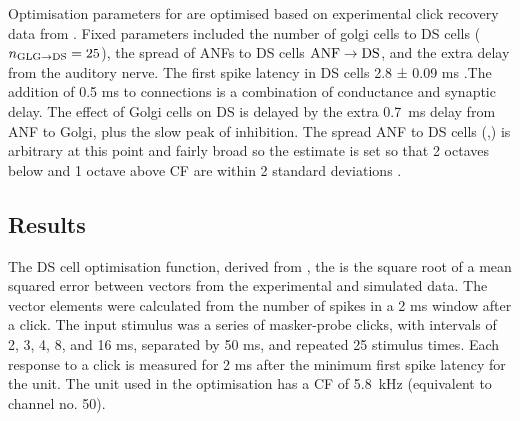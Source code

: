 Optimisation parameters for \GLGDS are optimised based on experimental click
recovery data from \citep{BackoffPalombiEtAl:1997}.  Fixed parameters included
the number of golgi cells to DS cells ($\protect n_{\protect\textrm{{GLG}}\to\textrm{{DS}}} = 25$), the spread of ANFs to DS
cells $\protect\textrm{{ANF}}\to\textrm{{DS}}$, and the extra delay from the auditory nerve.  The first spike
latency in DS cells 2.8 ± 0.09 ms \citep{RhodeSmith:1986}.The addition of 0.5 ms
to \ANFDS connections is a combination of conductance and synaptic delay. The
effect of Golgi cells on DS is delayed by the extra 0.7~ms delay from ANF to
Golgi, plus the slow peak of \GABAa inhibition.  The spread ANF to DS cells
(\sANFDSh,\sANFDSl) is arbitrary at this point and fairly broad so the estimate
is set so that 2 octaves below and 1 octave above CF are within 2 standard
deviations \citep{PaoliniClark:1999}.






\subsection{Results}

The DS cell optimisation function, derived from \citet{BackoffPalombiEtAl:1997},  the is the square root of a mean squared error between
vectors from the experimental and simulated data. The vector elements were
calculated from the number of spikes in a 2 ms window after a click.  The input
stimulus was a series of masker-probe clicks, with intervals of 2, 3, 4, 8, and
16 ms, separated by 50 ms, and repeated 25 stimulus times. Each response to a
click is measured for 2 ms after the minimum first spike latency for the unit.
The unit used in the optimisation has a CF of 5.8~kHz (equivalent to channel
no. 50).


